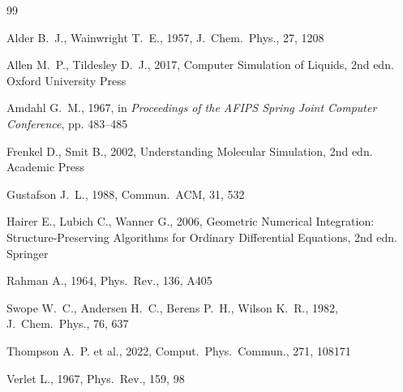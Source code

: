 \documentclass[10pt,twocolumn]{article}
\begin{document}


\begin{thebibliography}{99}

Alder B.~J., Wainwright T.~E., 1957, J.\ Chem.\ Phys., 27, 1208

Allen M.~P., Tildesley D.~J., 2017, Computer Simulation of Liquids, 2nd edn.
Oxford University Press

Amdahl G.~M., 1967, in \emph{Proceedings of the AFIPS Spring Joint Computer Conference}, pp. 483--485

Frenkel D., Smit B., 2002, Understanding Molecular Simulation, 2nd edn.
Academic Press

Gustafson J.~L., 1988, Commun.\ ACM, 31, 532

Hairer E., Lubich C., Wanner G., 2006, Geometric Numerical Integration:
Structure-Preserving Algorithms for Ordinary Differential Equations, 2nd edn.
Springer

Rahman A., 1964, Phys.\ Rev., 136, A405

Swope W.~C., Andersen H.~C., Berens P.~H., Wilson K.~R., 1982,
J.\ Chem.\ Phys., 76, 637

Thompson A.~P. et al., 2022, Comput.\ Phys.\ Commun., 271, 108171

Verlet L., 1967, Phys.\ Rev., 159, 98

\end{thebibliography}
\end{document}
